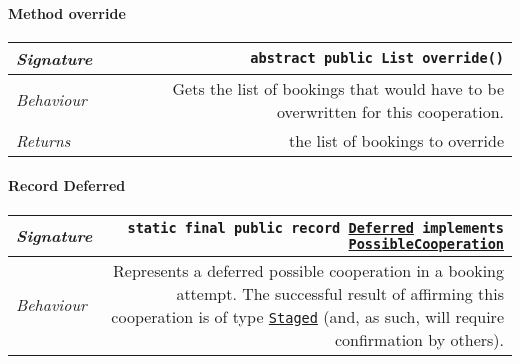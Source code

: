 \begin{adjustwidth}{1.5em}{0pt}
\begin{adjustwidth}{1.5em}{0pt}
\begin{adjustwidth}{1.5em}{0pt}
\begin{adjustwidth}{1.5em}{0pt}
{\begin{tabularx}{1.0\linewidth}{@{}l R@{}}
        \end{tabularx}}
      \end{adjustwidth}\paragraph{Method override\label{edu.kit.hci.soli.dto.BookingAttemptResult.PossibleCooperation@override()}}
      \begin{adjustwidth}{1.5em}{0pt}
        {\begin{tabularx}{1.0\linewidth}{@{}l R@{}}
          \emph{Signature} & \texttt{abstract public \texttt{List} override()} \\
          \hline
          \emph{Behaviour} & Gets the list of bookings that would have to be overwritten for this cooperation.    \\
          \hline
          \emph{Returns} & the list of bookings to override  \\
          \hline
  
        \end{tabularx}}
      \end{adjustwidth}\paragraph{Record Deferred\label{edu.kit.hci.soli.dto.BookingAttemptResult.PossibleCooperation.Deferred} }
      \begin{adjustwidth}{1.5em}{0pt}
        {\begin{tabularx}{1.0\linewidth}{@{}l R@{}}
          \emph{Signature} & \texttt{static final public  record \texttt{\hyperref[edu.kit.hci.soli.dto.BookingAttemptResult.PossibleCooperation.Deferred]{\texttt{Deferred}} implements \texttt{\hyperref[edu.kit.hci.soli.dto.BookingAttemptResult.PossibleCooperation]{\texttt{PossibleCooperation}}}}} \\
          \hline
          \emph{Behaviour} & Represents a deferred possible cooperation in a booking attempt. The successful result of affirming this cooperation is of type  \texttt{\hyperref[edu.kit.hci.soli.dto.BookingAttemptResult.Staged]{\texttt{Staged}}} (and, as such, will require confirmation by others).  \\
          \hline
  

\end{tabularx}}
\end{adjustwidth}
\end{adjustwidth}
\end{adjustwidth}
\end{adjustwidth}

